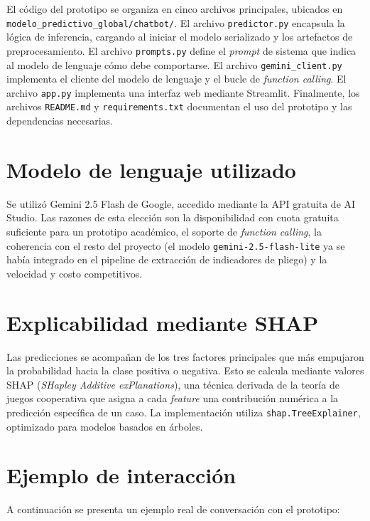 \documentclass[12pt,letterpaper,oneside]{report}
\begin{document}
El código del prototipo se organiza en cinco archivos principales, ubicados
en \texttt{modelo\_predictivo\_global/chatbot/}. El archivo
\texttt{predictor.py} encapsula la lógica de inferencia, cargando al iniciar
el modelo serializado y los artefactos de preprocesamiento. El archivo
\texttt{prompts.py} define el \emph{prompt} de sistema que indica al modelo
de lenguaje cómo debe comportarse. El archivo \texttt{gemini\_client.py}
implementa el cliente del modelo de lenguaje y el bucle de \emph{function
calling}. El archivo \texttt{app.py} implementa una interfaz web mediante
Streamlit. Finalmente, los archivos \texttt{README.md} y
\texttt{requirements.txt} documentan el uso del prototipo y las dependencias
necesarias.

\section{Modelo de lenguaje utilizado}

Se utilizó Gemini 2.5 Flash de Google, accedido mediante la API gratuita de
AI Studio. Las razones de esta elección son la disponibilidad con cuota
gratuita suficiente para un prototipo académico, el soporte de
\emph{function calling}, la coherencia con el resto del proyecto (el modelo
\texttt{gemini-2.5-flash-lite} ya se había integrado en el pipeline de
extracción de indicadores de pliego) y la velocidad y costo competitivos.

\section{Explicabilidad mediante SHAP}

Las predicciones se acompañan de los tres factores principales que más
empujaron la probabilidad hacia la clase positiva o negativa. Esto se calcula
mediante valores SHAP (\emph{SHapley Additive exPlanations}), una técnica
derivada de la teoría de juegos cooperativa que asigna a cada \emph{feature}
una contribución numérica a la predicción específica de un caso. La
implementación utiliza \texttt{shap.TreeExplainer}, optimizado para modelos
basados en árboles.

\section{Ejemplo de interacción}

A continuación se presenta un ejemplo real de conversación con el prototipo:
\end{document}
